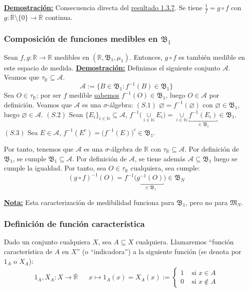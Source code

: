 \documentclass[12pt,a4paper]{article}
\newcommand{\R}{\mathbb{R}}
\newcommand{\N}{\mathbb{N}}
\newcommand{\smallcup}{\mathop{\cup}\limits}
\newcounter{unit}[section]
\newcounter{chapter}[unit]
\renewcommand{\theunit}{\arabic{unit}}
\renewcommand{\thechapter}{\arabic{chapter}}
\renewcommand{\thesubsubsection}{\theunit.\thechapter.\arabic{subsubsection}}
\newcommand{\result}[1]{%
  \subsubsection{#1}%
  \label{result:\thesubsubsection}
}
\newcommand{\dem}{
    \noindent \underline{\textbf{Demostración:}}
}
\newcommand{\nota}{
    \noindent \underline{\textbf{Nota:}}
}
\begin{document}
\vspace{4mm} \dem Consecuencia directa del \hyperref[result:1.3.7]{resultado 1.3.7}. Se tiene $\frac{1}{f} = g \circ f$ con $g : \overline{\R}\setminus\{0\} \longrightarrow \overline{\R}$ continua.

\vspace{6mm} \result{Composición de funciones medibles en \texorpdfstring{$\mathfrak{B}_1$}{B\_1}}
\hspace{3mm} Sean $f,g : \R \longrightarrow \R$ medibles en $(\R, \mathfrak{B}_1, \mu_1)$. Entonces, $g \circ f$ es también medible en este espacio de medida.
\newpage \dem Definimos el siguiente conjunto $\mathcal{A}$. Veamos que $\tau_{\R} \subseteq \mathcal{A}$.
$$\mathcal{A} := \{B \in \mathfrak{B}_1 : f^{-1}(B) \in \mathfrak{B}_1\}$$
Sea $O \in \tau_{\R}$; por ser $f$ medible \hyperref[result:1.3.5]{sabemos} $f^{-1}(O) \in \mathfrak{B}_1$, luego $O \in \mathcal{A}$ por definición.
\vspace{2mm} Veamos que $\mathcal{A}$ es una $\sigma$-álgebra:
\newline \indent $(S.1)$ $\varnothing = f^{-1}(\varnothing)$ con $\varnothing \in \mathfrak{B}_1$, luego $\varnothing \in \mathcal{A}$.
\vspace{3mm}\newline \indent $(S.2)$ Sean $\{E_i\}_{i\in\N} \subseteq \mathcal{A}$, \hspace{1mm}$f^{-1}\Big(\smallcup_{i\in\N} E_i\Big) = \smallcup_{i\in\N} \underbracket{f^{-1}(E_i)}_{\in \mathfrak{B}_1} \in \mathfrak{B}_1$.
\vspace{1mm} \newline \indent $(S.3)$ Sea $E \in \mathcal{A}$, $f^{-1}(E^c) = \big(f^{-1}(E)\big)^c \in \mathfrak{B}_1$.

\vspace{4mm} Por tanto, tenemos que $\mathcal{A}$ es una $\sigma$-álgebra de $\R$ con $\tau_{\R} \subseteq \mathcal{A}$. Por definición de $\mathfrak{B}_1$, se cumple $\mathfrak{B}_1 \subseteq \mathcal{A}$. Por definición de $\mathcal{A}$, se tiene además $\mathcal{A} \subseteq \mathfrak{B}_1$ luego se cumple la igualdad. Por tanto, sea $O \in \tau_{\R}$ cualquiera, sea cumple:
$$(g \circ f)^{-1}(O) = f^{-1} \Big(\underbracket{g^{-1}(O)}_{\in \mathfrak{B}_1}\Big) \in \mathfrak{B}_N$$

\nota Esta caracterización de medibilidad funciona para $\mathfrak{B}_1$, pero no para $\mathfrak{M}_N$.

\vspace{6mm}
\result{Definición de función característica}
\hspace{3mm} Dado un conjunto cualquiera $X$, sea $A \subseteq X$ cualquiera. Llamaremos ``función característica de $A$ en $X$'' (o ``indicadora'') a la siguiente función (se denota por $1_A$ o $X_A$):
\begin{align*}
    1_A, X_A : X \longrightarrow \overline{\R} &&
    x \longmapsto 1_A(x) = X_A(x) :=
    \begin{cases}
        1 &\text{ si } x \in A \\
        0 &\text{ si } x \notin A
    \end{cases}
\end{align*}
\end{document}
